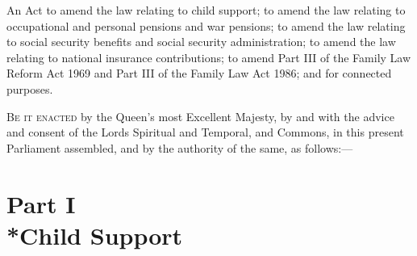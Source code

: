 \documentclass[12pt,a4paper]{article}
\title{\regstitle}
\author{2000 Chapter 19}
\date{Royal Assent
28th July 2000\\
}
\begin{document}
\maketitle

{\noindent\large
An Act to amend the law relating to child support; to amend the law relating to occupational and personal pensions and war pensions; to amend the law relating to social security benefits and social security administration; to amend the law relating to national insurance contributions; to amend Part III of the Family Law Reform Act 1969 and Part III of the Family Law Act 1986; and for connected purposes.

}

\bigskip

\lettrine{B}{e it enacted} by the Queen’s most Excellent Majesty, by and with the advice and consent of the Lords Spiritual and Temporal, and Commons, in this present Parliament assembled, and by the authority of the same, as follows:—  

{\sloppy

\tableofcontents

}

\bigskip

\setcounter{secnumdepth}{-2}

\part[Part I --- Child Support]{Part I\\*Child Support}

\renewcommand\parthead{--- Part I}
\end{document}
